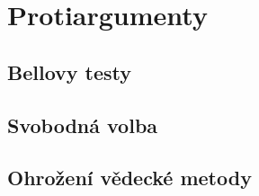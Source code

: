 \section{Protiargumenty}
\subsection{Bellovy testy}
\subsection{Svobodná volba}
\subsection{Ohrožení vědecké metody}
